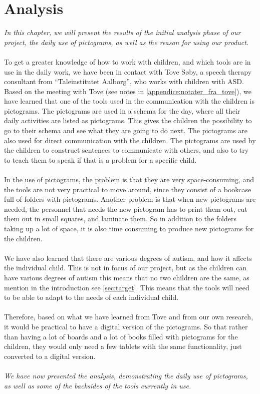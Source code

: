 \chapter{Analysis}

\textit{In this chapter, we will present the results of the initial analysis phase of our project, the daily use of pictograms, as well as the reason for using our product.}\\
\\
To get a greater knowledge of how to work with children, and which tools are in use in the daily work, we have been in contact with  Tove S\o{}by, a speech therapy consultant from ``Taleinstitutet Aalborg'', who works with children with ASD.\\ 

Based on the meeting with Tove (see notes in \autoref{appendice:notater_fra_tove}), we have learned that one of the tools used in the communication with the children is pictograms.
The pictograms are used in a schema for the day, where all their daily activities are listed as pictograms.
This gives the children the possibility to go to their schema and see what they are going to do next. 
The pictograms are also used for direct communication with the children. The pictograms are used by the children to construct sentences to communicate with others, and also to try to teach them to speak if that is a problem for a specific child.\\
\\
In the use of pictograms, the problem is that they are very space-consuming, and the tools are not very practical to move around, since they consist of a bookcase full of folders with pictograms. 
Another problem is that when new pictograms are needed, the personnel that needs the new pictogram has to print them out, cut them out in small squares, and laminate them. 
So in addition to the folders taking up a lot of space, it is also time consuming to produce new pictograms for the children.\\ 
\\
We have also learned that there are various degrees of autism, and how it affects the individual child. 
This is not in focus of our project, but as the children can have various degrees of autism this means that no two children are the same, as mention in the introduction see \autoref{sec:target}. 
This means that the tools will need to be able to adapt to the needs of each individual child.\\
\\ 
Therefore, based on what we have learned from Tove and from our own research, it would be practical to have a digital version of the pictograms. So that rather than having a lot of boards and a lot of books filled with pictograms for the children, they would only need a few tablets with the same functionality, just converted to a digital version.\\
\\
\textit{We have now presented the analysis, demonstrating the daily use of pictograms, as well as some of the backsides of the tools currently in use. }